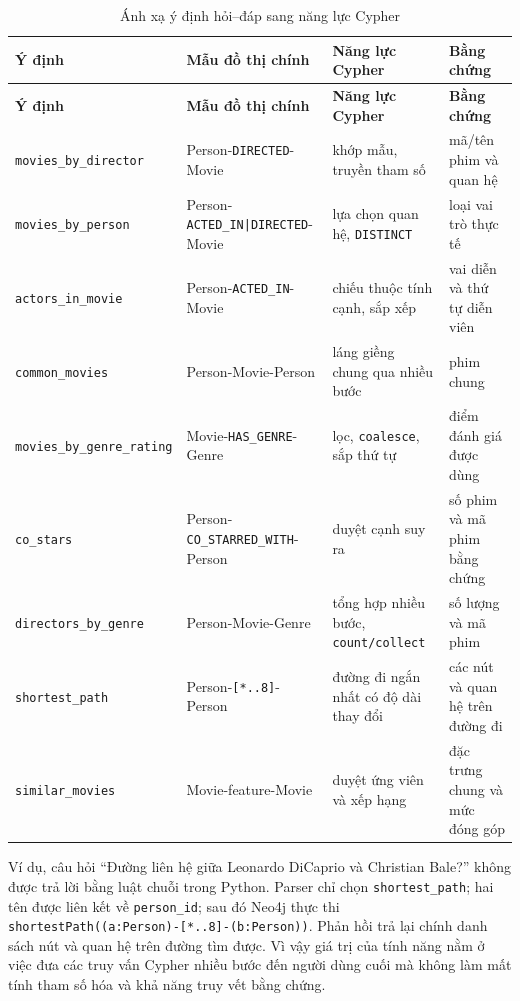 \begin{longtable}{|>{\raggedright\arraybackslash}p{}|>{\raggedright\arraybackslash}p{}|>{\raggedright\arraybackslash}p{}|>{\raggedright\arraybackslash}p{}|}
\caption{Ánh xạ ý định hỏi--đáp sang năng lực Cypher}\label{tab:6-2} \\
\hline
\textbf{Ý định} & \textbf{Mẫu đồ thị chính} & \textbf{Năng lực Cypher} & \textbf{Bằng chứng} \\ \hline
\endfirsthead\hline \textbf{Ý định} & \textbf{Mẫu đồ thị chính} & \textbf{Năng lực Cypher} & \textbf{Bằng chứng} \\ \hline\endhead
\texttt{movies\_by\_director} & Person-\texttt{DIRECTED}-Movie & khớp mẫu, truyền tham số & mã/tên phim và quan hệ \\ \hline
\texttt{movies\_by\_person} & Person-\texttt{ACTED\_IN|DIRECTED}-Movie & lựa chọn quan hệ, \texttt{DISTINCT} & loại vai trò thực tế \\ \hline
\texttt{actors\_in\_movie} & Person-\texttt{ACTED\_IN}-Movie & chiếu thuộc tính cạnh, sắp xếp & vai diễn và thứ tự diễn viên \\ \hline
\texttt{common\_movies} & Person-Movie-Person & láng giềng chung qua nhiều bước & phim chung \\ \hline
\texttt{movies\_by\_genre\_rating} & Movie-\texttt{HAS\_GENRE}-Genre & lọc, \texttt{coalesce}, sắp thứ tự & điểm đánh giá được dùng \\ \hline
\texttt{co\_stars} & Person-\texttt{CO\_STARRED\_WITH}-Person & duyệt cạnh suy ra & số phim và mã phim bằng chứng \\ \hline
\texttt{directors\_by\_genre} & Person-Movie-Genre & tổng hợp nhiều bước, \texttt{count/collect} & số lượng và mã phim \\ \hline
\texttt{shortest\_path} & Person-\texttt{[*..8]}-Person & đường đi ngắn nhất có độ dài thay đổi & các nút và quan hệ trên đường đi \\ \hline
\texttt{similar\_movies} & Movie-feature-Movie & duyệt ứng viên và xếp hạng & đặc trưng chung và mức đóng góp \\ \hline
\end{longtable}

Ví dụ, câu hỏi “Đường liên hệ giữa Leonardo DiCaprio và Christian Bale?” không
được trả lời bằng luật chuỗi trong Python. Parser chỉ chọn
\texttt{shortest\_path}; hai tên được liên kết về \texttt{person\_id}; sau đó
Neo4j thực thi \texttt{shortestPath((a:Person)-[*..8]-(b:Person))}. Phản hồi trả
lại chính danh sách nút và quan hệ trên đường tìm được. Vì vậy giá trị của
tính năng nằm ở việc đưa các truy vấn Cypher nhiều bước đến người dùng cuối mà
không làm mất tính tham số hóa và khả năng truy vết bằng chứng.


